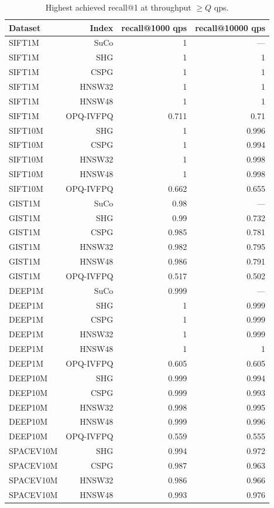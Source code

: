 \begin{table}[t]
\centering
\small
\caption{Highest achieved recall@1 at throughput \(\geq Q\) qps.}
\label{tab:recall-at-qps-k1}
\begin{tabular}{lrrr}
\toprule
Dataset & Index & recall@1000 qps & recall@10000 qps \\
\midrule
SIFT1M & SuCo & 1 & — \\
SIFT1M & SHG & 1 & 1 \\
SIFT1M & CSPG & 1 & 1 \\
SIFT1M & HNSW32 & 1 & 1 \\
SIFT1M & HNSW48 & 1 & 1 \\
SIFT1M & OPQ-IVFPQ & 0.711 & 0.71 \\
SIFT10M & SHG & 1 & 0.996 \\
SIFT10M & CSPG & 1 & 0.994 \\
SIFT10M & HNSW32 & 1 & 0.998 \\
SIFT10M & HNSW48 & 1 & 0.998 \\
SIFT10M & OPQ-IVFPQ & 0.662 & 0.655 \\
GIST1M & SuCo & 0.98 & — \\
GIST1M & SHG & 0.99 & 0.732 \\
GIST1M & CSPG & 0.985 & 0.781 \\
GIST1M & HNSW32 & 0.982 & 0.795 \\
GIST1M & HNSW48 & 0.986 & 0.791 \\
GIST1M & OPQ-IVFPQ & 0.517 & 0.502 \\
DEEP1M & SuCo & 0.999 & — \\
DEEP1M & SHG & 1 & 0.999 \\
DEEP1M & CSPG & 1 & 0.999 \\
DEEP1M & HNSW32 & 1 & 0.999 \\
DEEP1M & HNSW48 & 1 & 1 \\
DEEP1M & OPQ-IVFPQ & 0.605 & 0.605 \\
DEEP10M & SHG & 0.999 & 0.994 \\
DEEP10M & CSPG & 0.999 & 0.993 \\
DEEP10M & HNSW32 & 0.998 & 0.995 \\
DEEP10M & HNSW48 & 0.999 & 0.996 \\
DEEP10M & OPQ-IVFPQ & 0.559 & 0.555 \\
SPACEV10M & SHG & 0.994 & 0.972 \\
SPACEV10M & CSPG & 0.987 & 0.963 \\
SPACEV10M & HNSW32 & 0.986 & 0.966 \\
SPACEV10M & HNSW48 & 0.993 & 0.976 \\

\end{tabular}
\end{table}
